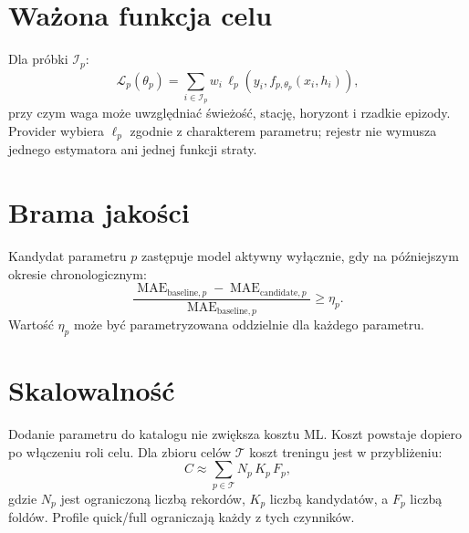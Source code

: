 \documentclass[11pt,a4paper]{article}
\begin{document}
\section{Ważona funkcja celu}

Dla próbki $\mathcal I_p$:
\[
 \mathcal L_p(\theta_p)
 =\sum_{i\in\mathcal I_p}w_i\,
   \ell_p\!\left(y_i,f_{p,\theta_p}(x_i,h_i)\right),
\]
przy czym waga może uwzględniać świeżość, stację, horyzont i rzadkie epizody.
Provider wybiera $\ell_p$ zgodnie z charakterem parametru; rejestr nie wymusza
jednego estymatora ani jednej funkcji straty.

\section{Brama jakości}

Kandydat parametru $p$ zastępuje model aktywny wyłącznie, gdy na późniejszym
okresie chronologicznym:
\[
 \frac{\operatorname{MAE}_{\mathrm{baseline},p}
       -\operatorname{MAE}_{\mathrm{candidate},p}}
      {\operatorname{MAE}_{\mathrm{baseline},p}}
 \ge \eta_p.
\]
Wartość $\eta_p$ może być parametryzowana oddzielnie dla każdego parametru.

\section{Skalowalność}

Dodanie parametru do katalogu nie zwiększa kosztu ML. Koszt powstaje dopiero po
włączeniu roli celu. Dla zbioru celów $\mathcal T$ koszt treningu jest w
przybliżeniu:
\[
 C\approx\sum_{p\in\mathcal T}
   N_p\,K_p\,F_p,
\]
gdzie $N_p$ jest ograniczoną liczbą rekordów, $K_p$ liczbą kandydatów, a
$F_p$ liczbą foldów. Profile quick/full ograniczają każdy z tych czynników.
\end{document}
